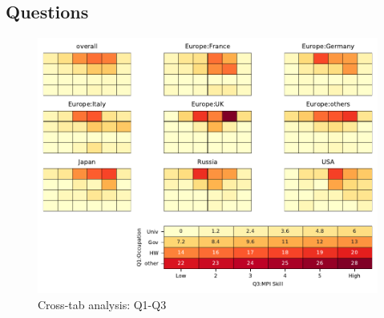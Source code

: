 
\subsection{Questions}


\begin{figure}
\begin{center}
\includegraphics[width=12cm]{../pdfs/Q1-Q3.pdf}
\caption{Cross-tab analysis: Q1-Q3}
\label{fig:Q1-Q3}
\end{center}
\end{figure}
